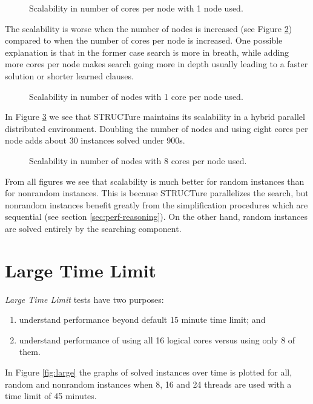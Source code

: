 \begin{figure}
  \centering
  \caption{Scalability in number of cores per node with 1 node used.}
  \label{fig:para-1X}
\end{figure}

The scalability is worse when the number of nodes is increased
(see Figure \ref{fig:para-X1}) compared to when the number of
cores per node is increased. One possible explanation is that in
the former case search is more in breath, while adding more cores
per node makes search going more in depth usually leading to a
faster solution or shorter learned clauses.

\begin{figure}
  \centering
  \caption{Scalability in number of nodes with 1 core per node used.}
  \label{fig:para-X1}
\end{figure}

In Figure \ref{fig:para-X8} we see that STRUCTure maintains
its scalability in a hybrid parallel distributed environment.
Doubling the number of nodes and using eight cores per node adds
about 30 instances solved under 900s.

\begin{figure}
  \centering
  \caption{Scalability in number of nodes with 8 cores per node used.}
  \label{fig:para-X8}
\end{figure}

From all figures we see that scalability is much better for random
instances than for nonrandom instances. This is because STRUCTure
parallelizes the search, but nonrandom instances benefit greatly
from the simplification procedures which are sequential (see section
\ref{sec:perf-reasoning}). On the other hand, random instances are
solved entirely by the searching component.


\section{Large Time Limit}

\emph{Large Time Limit} tests have two purposes:
\begin{enumerate}
  \item understand performance beyond default 15 minute time limit; and
  \item understand performance of using all 16 logical cores versus
  using only 8 of them.
\end{enumerate}

In Figure \ref{fig:large} the graphs of solved instances over time is
plotted for all, random and nonrandom instances when 8, 16 and 24
threads are used with a time limit of 45 minutes.

